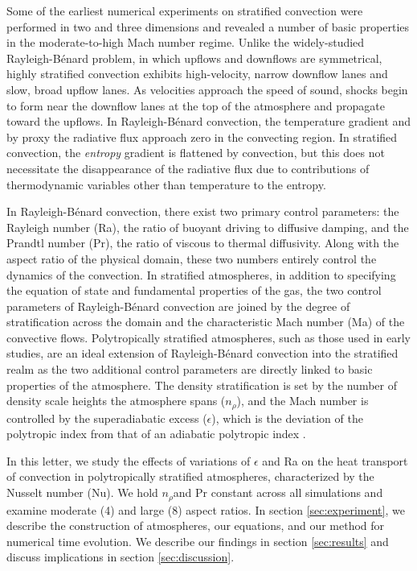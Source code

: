\documentclass[aps, prl, twocolumn, groupedaddress, amsfonts, amssymb, amsmath]{revtex4-1}
\newcommand{\RB}{Rayleigh-B\'{e}nard }
\newcommand{\nrho}{\ensuremath{n_{\rho}}}
\begin{document}
Some of the earliest numerical experiments on stratified convection
were performed in two \cite{graham1975, chan&all1982,
hurlburt&all1984, cattaneo&all1990} and three \cite{cattaneo&all1991, brummell&all1996} dimensions and
revealed a number of basic properties in the moderate-to-high Mach number regime.
Unlike the widely-studied \RB problem, in which upflows and downflows are symmetrical, highly stratified
convection exhibits high-velocity, narrow downflow lanes and slow, broad upflow lanes.  As velocities approach
the speed of sound, shocks begin to form near the downflow lanes at the top of the atmosphere and propagate toward the upflows.
In \RB convection, the temperature gradient
and by proxy the radiative flux approach zero in the convecting region.  In stratified convection, the 
\emph{entropy} gradient is flattened by convection, but this does not necessitate the disappearance of the
radiative flux due to contributions of thermodynamic variables other than temperature to the entropy.

In \RB convection, there exist two primary control parameters: the Rayleigh number (Ra), the ratio of
buoyant driving to diffusive damping, and the Prandtl number (Pr), the ratio of viscous to thermal
diffusivity.  Along with the aspect ratio of the physical domain, these two numbers entirely control the
dynamics of the convection.  In stratified atmospheres, in addition to specifying the equation of state and
fundamental properties of the gas, the two control parameters of \RB convection are joined by the degree of
stratification across the domain and the characteristic Mach number (Ma) of the convective flows.  
Polytropically stratified atmospheres, such as those used in early studies, are an ideal extension of
\RB convection into the stratified realm as the two additional control parameters are directly linked to
basic properties of the atmosphere.  The density stratification is set by the number of density scale heights
the atmosphere spans (\nrho), and the Mach number is controlled by the superadiabatic excess ($\epsilon$),
which is the deviation of the polytropic index from that of an adiabatic polytropic index \cite{graham1975}.

In this letter, we study the effects of variations of $\epsilon$ and Ra on the heat transport of convection
in polytropically stratified atmospheres, characterized by the Nusselt number (Nu).  We hold \nrho and Pr
constant across all simulations and examine moderate (4) and large (8) aspect ratios.  In section 
\ref{sec:experiment}, we describe the construction of atmospheres, our equations, and our method for
numerical time evolution.  We describe our findings in section \ref{sec:results} and discuss
implications in section \ref{sec:discussion}.
\end{document}
